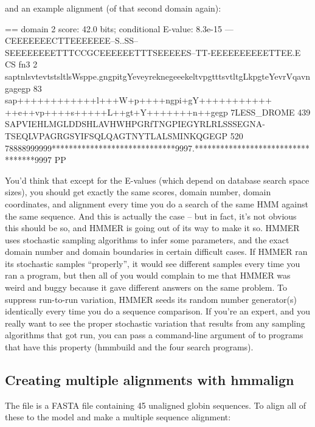 and an example alignment (of that second domain again):

\begin{sreoutput}
 == domain 2    score: 42.0 bits;  conditional E-value: 8.3e-15
                  ---CEEEEEEECTTEEEEEEE--S..SS--SEEEEEEEETTTCCGCEEEEEETTTSEEEEES--TT-EEEEEEEEEETTEE.E CS
          fn3   2 saptnlsvtevtstsltlsWsppe.gngpitgYeveyreknegeeekeltvpgtttsvtltgLkpgteYevrVqavngagegp 83 
                  sap++++++++++++l+++W+p++++ngpi+gY+++++++++++ ++e++vp++++s+++++L++gt+Y+++++++n++gegp
  7LESS_DROME 439 SAPVIEHLMGLDDSHLAVHWHPGRfTNGPIEGYRLRLSSSEGNA-TSEQLVPAGRGSYIFSQLQAGTNYTLALSMINKQGEGP 520
                  78888999999*****************************9997.**********************************9997 PP
\end{sreoutput}

You'd think that except for the E-values (which depend on database
search space sizes), you should get exactly the same scores, domain
number, domain coordinates, and alignment every time you do a search
of the same HMM against the same sequence. And this is actually the
case -- but in fact, it's not obvious this should be so, and HMMER is
going out of its way to make it so. HMMER uses stochastic sampling
algorithms to infer some parameters, and the exact domain number and
domain boundaries in certain difficult cases. If HMMER ran its
stochastic samples ``properly'', it would see different samples every
time you ran a program, but then all of you would complain to me that
HMMER was weird and buggy because it gave different answers on the
same problem. To suppress run-to-run variation, HMMER seeds its random
number generator(s) identically every time you do a sequence
comparison. If you're an expert, and you really want to see the proper
stochastic variation that results from any sampling algorithms that
got run, you can pass a command-line argument of  to
programs that have this property (hmmbuild and the four search
programs).


\subsection{Creating multiple alignments with hmmalign}

The file  is a FASTA file containing 45
unaligned globin sequences. To align all of these to the
 model and make a multiple sequence alignment:


